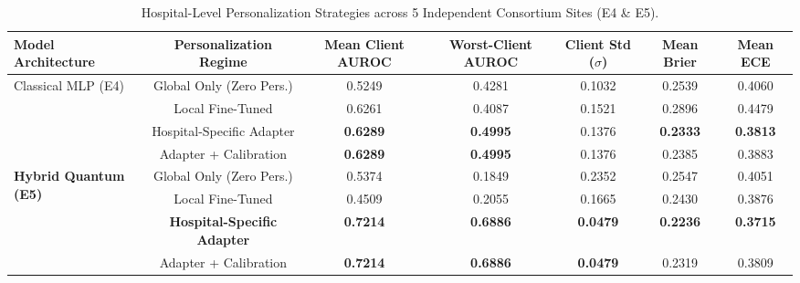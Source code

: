 \documentclass{article}
\begin{document}
\vspace{1em}

\begin{table}[htbp]
\centering
\small
\caption{Hospital-Level Personalization Strategies across 5 Independent Consortium Sites (E4 \& E5).}
\label{tab:personalization}
\begin{tabular}{lcccccc}
\toprule
\textbf{Model Architecture} & \textbf{Personalization Regime} & \textbf{Mean Client AUROC} & \textbf{Worst-Client AUROC} & \textbf{Client Std ($\sigma$)} & \textbf{Mean Brier} & \textbf{Mean ECE} \\
\midrule
\multirow{4}{*}{Classical MLP (E4)} 
& Global Only (Zero Pers.) & 0.5249 & 0.4281 & 0.1032 & 0.2539 & 0.4060 \\
& Local Fine-Tuned & 0.6261 & 0.4087 & 0.1521 & 0.2896 & 0.4479 \\
& Hospital-Specific Adapter & \textbf{0.6289} & \textbf{0.4995} & 0.1376 & \textbf{0.2333} & \textbf{0.3813} \\
& Adapter + Calibration & \textbf{0.6289} & \textbf{0.4995} & 0.1376 & 0.2385 & 0.3883 \\
\midrule
\multirow{4}{*}{\textbf{Hybrid Quantum (E5)}} 
& Global Only (Zero Pers.) & 0.5374 & 0.1849 & 0.2352 & 0.2547 & 0.4051 \\
& Local Fine-Tuned & 0.4509 & 0.2055 & 0.1665 & 0.2430 & 0.3876 \\
& \textbf{Hospital-Specific Adapter} & \textbf{0.7214} & \textbf{0.6886} & \textbf{0.0479} & \textbf{0.2236} & \textbf{0.3715} \\
& Adapter + Calibration & \textbf{0.7214} & \textbf{0.6886} & \textbf{0.0479} & 0.2319 & 0.3809 \\
\bottomrule
\end{tabular}
\end{table}

\vspace{1em}
\end{document}
